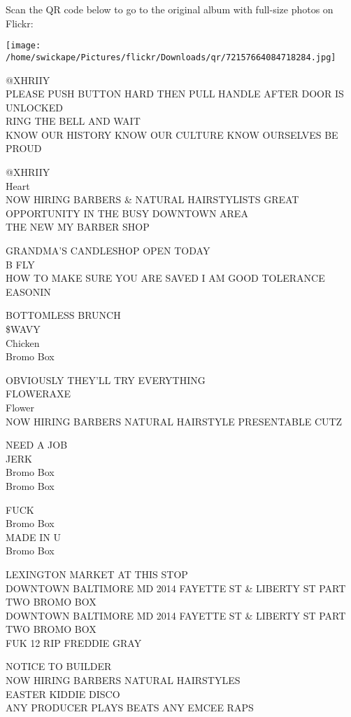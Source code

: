 \documentclass[10pt,letterpaper]{article}
\begin{document}
Scan the QR code below to go to the original album with full-size photos on Flickr:

\texttt{[image: /home/swickape/Pictures/flickr/Downloads/qr/72157664084718284.jpg]}


@XHRIIY\\
PLEASE PUSH BUTTON HARD THEN PULL HANDLE AFTER DOOR IS UNLOCKED\\
RING THE BELL AND WAIT\\
KNOW OUR HISTORY KNOW OUR CULTURE KNOW OURSELVES BE PROUD

@XHRIIY\\
Heart\\
NOW HIRING BARBERS \& NATURAL HAIRSTYLISTS GREAT OPPORTUNITY IN THE BUSY DOWNTOWN AREA\\
THE NEW MY BARBER SHOP

GRANDMA'S CANDLESHOP OPEN TODAY\\
B FLY\\
HOW TO MAKE SURE YOU ARE SAVED I AM GOOD TOLERANCE\\
EASONIN

BOTTOMLESS BRUNCH\\
\$WAVY\\
Chicken\\
Bromo Box

OBVIOUSLY THEY'LL TRY EVERYTHING\\
FLOWERAXE\\
Flower\\
NOW HIRING BARBERS NATURAL HAIRSTYLE PRESENTABLE CUTZ

NEED A JOB\\
JERK\\
Bromo Box\\
Bromo Box

FUCK\\
Bromo Box\\
MADE IN U\\
Bromo Box

LEXINGTON MARKET AT THIS STOP\\
DOWNTOWN BALTIMORE MD 2014 FAYETTE ST \& LIBERTY ST PART TWO BROMO BOX\\
DOWNTOWN BALTIMORE MD 2014 FAYETTE ST \& LIBERTY ST PART TWO BROMO BOX\\
FUK 12 RIP FREDDIE GRAY

NOTICE TO BUILDER\\
NOW HIRING BARBERS NATURAL HAIRSTYLES\\
EASTER KIDDIE DISCO\\
ANY PRODUCER PLAYS BEATS ANY EMCEE RAPS
\end{document}
